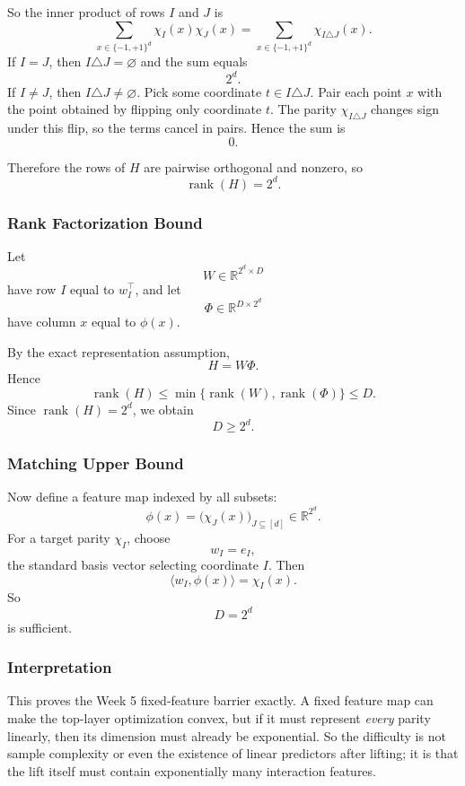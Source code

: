 \documentclass{article}
\begin{document}
So the inner product of rows $I$ and $J$ is
$$
\sum_{x\in\{-1,+1\}^d} \chi_I(x)\chi_J(x)
=
\sum_{x\in\{-1,+1\}^d} \chi_{I\triangle J}(x).
$$
If $I=J$, then $I\triangle J=\varnothing$ and the sum equals
$$
2^d.
$$
If $I\neq J$, then $I\triangle J\neq\varnothing$. Pick some coordinate $t\in I\triangle J$. Pair each point $x$ with the point obtained by flipping only coordinate $t$. The parity $\chi_{I\triangle J}$ changes sign under this flip, so the terms cancel in pairs. Hence the sum is
$$
0.
$$

Therefore the rows of $H$ are pairwise orthogonal and nonzero, so
$$
\operatorname{rank}(H)=2^d.
$$

\subsubsection{Rank Factorization Bound}

Let
$$
W\in\mathbb{R}^{2^d\times D}
$$
have row $I$ equal to $w_I^\top$, and let
$$
\Phi\in\mathbb{R}^{D\times 2^d}
$$
have column $x$ equal to $\phi(x)$.

By the exact representation assumption,
$$
H=W\Phi.
$$
Hence
$$
\operatorname{rank}(H)
\le
\min\{\operatorname{rank}(W),\operatorname{rank}(\Phi)\}
\le D.
$$
Since $\operatorname{rank}(H)=2^d$, we obtain
$$
D\ge 2^d.
$$

\subsubsection{Matching Upper Bound}

Now define a feature map indexed by all subsets:
$$
\phi(x)
=
\bigl(\chi_J(x)\bigr)_{J\subseteq[d]}
\in \mathbb{R}^{2^d}.
$$
For a target parity $\chi_I$, choose
$$
w_I=e_I,
$$
the standard basis vector selecting coordinate $I$. Then
$$
\langle w_I,\phi(x)\rangle
=
\chi_I(x).
$$
So
$$
D=2^d
$$
is sufficient.

\subsubsection{Interpretation}

This proves the Week 5 fixed-feature barrier exactly. A fixed feature map can make the top-layer optimization convex, but if it must represent \emph{every} parity linearly, then its dimension must already be exponential. So the difficulty is not sample complexity or even the existence of linear predictors after lifting; it is that the lift itself must contain exponentially many interaction features.
\end{document}
